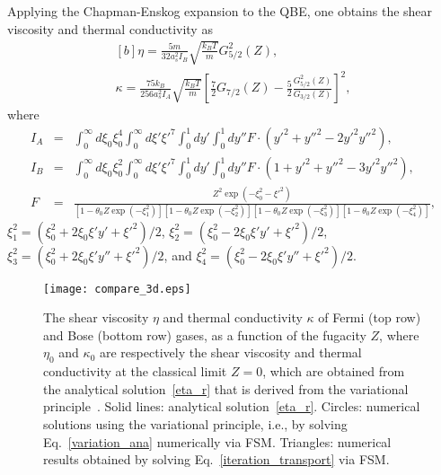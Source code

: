 Applying the Chapman-Enskog expansion to the QBE, one obtains the shear viscosity and thermal conductivity as~\cite{Watabe2010}
\begin{equation}\label{eta_r} 
\begin{aligned}[b]
\eta=\frac{5m}{32a_s^2I_B}\sqrt{\frac{k_B
		T}{m}}{G}^2_{5/2}(Z), \\
\kappa=\frac{75k_B}{256a_s^2I_A}\sqrt{\frac{k_B
		T}{m}}\left[\frac{7}{2}{{G}_{7/2}(Z)}
-\frac{5}{2}\frac{{G}^2_{5/2}(Z)}{{G}_{3/2}(Z)}\right]^2, 
\end{aligned}
\end{equation}
where 
\begin{eqnarray*}
	I_A&=&\int_0^\infty d\xi_0\xi_0^4\int_0^\infty
	d\xi'{\xi'^7}\int_0^1dy'\int_0^1dy''F\cdot(y'^2+y''^2-2y'^2y''^2), \\
	I_B&=&\int_0^\infty d\xi_0\xi_0^2\int_0^\infty
	d\xi'{\xi'^7}\int_0^1dy'\int_0^1dy''F\cdot(1+y'^2+y''^2-3y'^2y''^2),\\
	F&=&\frac{Z^2\exp(-\xi_0^2-\xi'^2)}{[1-\theta_0Z\exp(-\xi_1^2)][1-\theta_0Z\exp(-\xi_2^2)][1-\theta_0Z\exp(-\xi_3^2)][1-\theta_0Z\exp(-\xi_4^2)]},
\end{eqnarray*}
$\xi_1^2=(\xi_0^2+2\xi_0\xi'y'+\xi'^2)/2$, 
$\xi_2^2=(\xi_0^2-2\xi_0\xi'y'+\xi'^2)/2$, 
$\xi_3^2=(\xi_0^2+2\xi_0\xi'y''+\xi'^2)/2$, and 
$\xi_4^2=(\xi_0^2-2\xi_0\xi'y''+\xi'^2)/2$.


\begin{figure}[t]
	\centering
	\texttt{[image: compare\_3d.eps]}
	\caption{The shear viscosity $\eta$ and thermal conductivity $\kappa$ of Fermi (top row) and Bose (bottom row) gases, as a function of the fugacity $Z$,  where $\eta_0$ and $\kappa_0$ are respectively the shear viscosity and thermal conductivity at the classical limit $Z=0$, which are obtained from the analytical solution~\eqref{eta_r} that is derived from the variational principle~\cite{Nikuni1998,Watabe2010}. Solid lines: analytical solution~\eqref{eta_r}. Circles: numerical solutions using the variational principle, i.e., by solving Eq.~\eqref{variation_ana} numerically via  FSM. Triangles: numerical results obtained by solving Eq.~\eqref{iteration_transport} via FSM. }\label{compare_transport_3d}
\end{figure}




